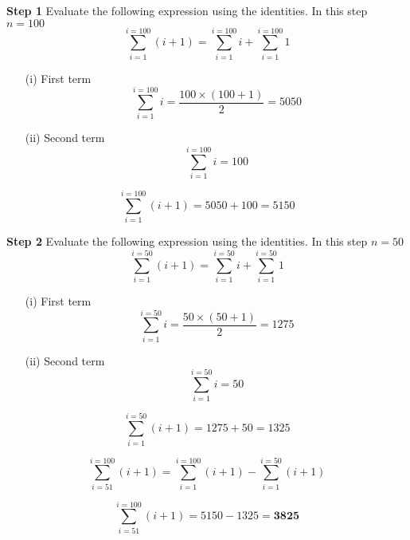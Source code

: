 \textbf{Step 1} Evaluate the following expression using the identities. In this step $n=100$
\[ \sum^{i=100}_{i=1} (i+1)  = \sum^{i=100}_{i=1} i  +  \sum^{i=100}_{i=1} 1  \]

\begin{itemize}
\item[(i)] First term \[\sum^{i=100}_{i=1} i  = \frac{100\times(100+1)}{2}  = 5050\]

\item[(ii)] Second term \[ \sum^{i=100}_{i=1} i  =  100\]
\end{itemize}

\[ \sum^{i=100}_{i=1} (i+1)  = 5050 + 100 = 5150 \]




\textbf{Step 2} Evaluate the following expression using the identities. In this step $n=50$
\[ \sum^{i=50}_{i=1} (i+1)  = \sum^{i=50}_{i=1} i  +  \sum^{i=50}_{i=1} 1  \]

\begin{itemize}
\item[(i)] First term \[\sum^{i=50}_{i=1} i  = \frac{50\times(50+1)}{2}  = 1275\]

\item[(ii)] Second term \[ \sum^{i=50}_{i=1} i  =  50\]
\end{itemize}

\[ \sum^{i=50}_{i=1} (i+1)  = 1275 + 50 = 1325 \]


\[ \sum^{i=100}_{i=51} (i+1) = \sum^{i=100}_{i=1} (i+1)  - \sum^{i=50}_{i=1}(i+1)   \]

\[ \sum^{i=100}_{i=51} (i+1)  = 5150 - 1325 =\boldsymbol{3825} \]



